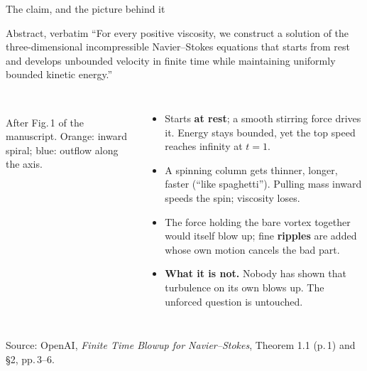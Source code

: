 \documentclass[aspectratio=169, 10pt]{beamer}
\newcommand{\src}[1]{{\par\vspace{2pt}\scriptsize\color{inkmuted}#1\par}}
\newcommand{\q}[1]{``#1''}
\begin{document}
\begin{frame}{The claim, and the picture behind it}
  \begin{block}{Abstract, verbatim}
    \footnotesize\q{For every positive viscosity, we construct a solution of the
    three-dimensional incompressible Navier--Stokes equations that starts
    from rest and develops unbounded velocity in finite time while
    maintaining uniformly bounded kinetic energy.}
  \end{block}
  \begin{columns}[c]
    \centering
    \\[2pt]{\scriptsize\color{inkmuted} After Fig.\,1 of the manuscript. Orange: inward spiral; blue: outflow along the axis.}
    \small
    \begin{itemize}
      \item Starts \textbf{at rest}; a smooth stirring force drives it. Energy
        stays bounded, yet the top speed reaches infinity at $t = 1$.
      \item A spinning column gets thinner, longer, faster (\q{like
        spaghetti}). Pulling mass inward speeds the spin; viscosity loses.
      \item The force holding the bare vortex together would itself blow up;
        fine \textbf{ripples} are added whose own motion cancels the bad part.
      \item \textbf{What it is not.} Nobody has shown that turbulence on its
        own blows up. The unforced question is untouched.
    \end{itemize}
  \end{columns}
  \src{Source: OpenAI, \emph{Finite Time Blowup for Navier--Stokes}, Theorem 1.1 (p.\,1) and \S2, pp.\,3--6.}
\end{frame}
\end{document}
